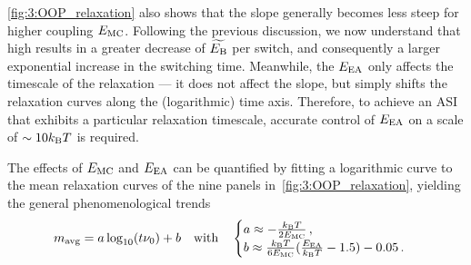 \cref{fig:3:OOP_relaxation} also shows that the slope generally becomes less steep for higher coupling $E_\mathrm{MC}$.
Following the previous discussion, we now understand that high  results in a greater decrease of $\widetilde{E_\mathrm{B}}$ per switch, and consequently a larger exponential increase in the switching time.
Meanwhile, the  $E_\mathrm{EA}$ only affects the timescale of the relaxation --- it does not affect the slope, but simply shifts the relaxation curves along the (logarithmic) time axis.
Therefore, to achieve an ASI that exhibits a particular relaxation timescale, accurate control of $E_\mathrm{EA}$ on a scale of $\sim 10\kBT$ is required. \par
The effects of $E_\mathrm{MC}$ and $E_\mathrm{EA}$ can be quantified by fitting a logarithmic curve to the mean relaxation curves of the nine panels in~\cref{fig:3:OOP_relaxation}, yielding the general phenomenological trends
\begin{equation}
	\label{eq:3:relaxation_fit_ab}
	\mavg = a \log_{10}(t \nu_0) + b \quad \mathrm{with} \quad \begin{cases}
		a \approx -\frac{\kBT}{2\EMC} \, \mathrm{,} \\
		b \approx \frac{\kBT}{6\EMC}(\frac{\EEA}{\kBT} - 1.5) - 0.05 \, \mathrm{.}
	\end{cases}
\end{equation}


